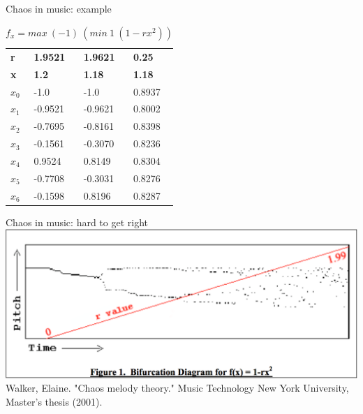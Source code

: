 \documentclass{beamer}
\begin{document}
               \begin{frame}{Chaos in music: example}
          \begin{table}[]
                              \centering
                        \caption{$f_x = max\ (-1)\ (min\ 1\ (1 - rx^2))$}
                              \label{my-label}
                              \begin{tabular}{l | lll} %
                              \textbf{r} & \textbf{1.9521} & \textbf{1.9621} & \textbf{0.25} \\
                              \textbf{x} & \textbf{1.2}    & \textbf{1.18}   & \textbf{1.18} \\
                              \hline
                              $x_0$      & -1.0            & -1.0            & 0.8937        \\
                              $x_1$      & -0.9521         & -0.9621         & 0.8002        \\
                              $x_2$      & -0.7695         & -0.8161         & 0.8398        \\
                              $x_3$      & -0.1561         & -0.3070         & 0.8236        \\
                              $x_4$      & 0.9524          & 0.8149          & 0.8304        \\
                              $x_5$      & -0.7708         & -0.3031         & 0.8276        \\
                              $x_6$      & -0.1598         & 0.8196          & 0.8287       
                              \end{tabular}
                      \end{table}
        \end{frame}
        
        \begin{frame}{Chaos in music: hard to get right}
                  \includegraphics[width=1\textwidth]{figures/chaos.png}\\
                  Walker, Elaine. "Chaos melody theory." Music Technology New York University, Master's thesis (2001).
        \end{frame}
\end{document}
